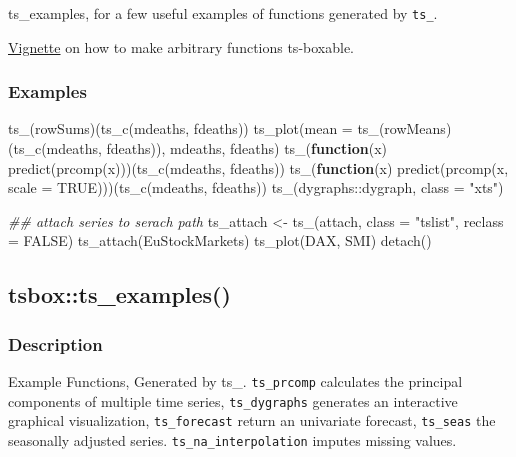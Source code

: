 \documentclass[
  letterpaper,
  DIV=11,
  numbers=noendperiod]{scrreport}
\newenvironment{Shaded}{\begin{snugshade}}{\end{snugshade}}
\newcommand{\AttributeTok}[1]{\textcolor[rgb]{0.40,0.45,0.13}{#1}}
\newcommand{\ConstantTok}[1]{\textcolor[rgb]{0.56,0.35,0.01}{#1}}
\newcommand{\ControlFlowTok}[1]{\textcolor[rgb]{0.00,0.23,0.31}{\textbf{#1}}}
\newcommand{\DocumentationTok}[1]{\textcolor[rgb]{0.37,0.37,0.37}{\textit{#1}}}
\newcommand{\FunctionTok}[1]{\textcolor[rgb]{0.28,0.35,0.67}{#1}}
\newcommand{\NormalTok}[1]{\textcolor[rgb]{0.00,0.23,0.31}{#1}}
\newcommand{\OtherTok}[1]{\textcolor[rgb]{0.00,0.23,0.31}{#1}}
\newcommand{\SpecialCharTok}[1]{\textcolor[rgb]{0.37,0.37,0.37}{#1}}
\newcommand{\StringTok}[1]{\textcolor[rgb]{0.13,0.47,0.30}{#1}}
\begin{document}
ts\_examples, for a few useful examples of functions generated by
\texttt{ts\_}.

\href{https://docs.ropensci.org/tsbox/articles/ts-functions.html}{Vignette}
on how to make arbitrary functions ts-boxable.

\subsubsection{Examples}\label{examples-81}

\begin{Shaded}
\begin{Highlighting}[]
\FunctionTok{ts\_}\NormalTok{(rowSums)(}\FunctionTok{ts\_c}\NormalTok{(mdeaths, fdeaths))}
\FunctionTok{ts\_plot}\NormalTok{(}\AttributeTok{mean =} \FunctionTok{ts\_}\NormalTok{(rowMeans)(}\FunctionTok{ts\_c}\NormalTok{(mdeaths, fdeaths)), mdeaths, fdeaths)}
\FunctionTok{ts\_}\NormalTok{(}\ControlFlowTok{function}\NormalTok{(x) }\FunctionTok{predict}\NormalTok{(}\FunctionTok{prcomp}\NormalTok{(x)))(}\FunctionTok{ts\_c}\NormalTok{(mdeaths, fdeaths))}
\FunctionTok{ts\_}\NormalTok{(}\ControlFlowTok{function}\NormalTok{(x) }\FunctionTok{predict}\NormalTok{(}\FunctionTok{prcomp}\NormalTok{(x, }\AttributeTok{scale =} \ConstantTok{TRUE}\NormalTok{)))(}\FunctionTok{ts\_c}\NormalTok{(mdeaths, fdeaths))}
\FunctionTok{ts\_}\NormalTok{(dygraphs}\SpecialCharTok{::}\NormalTok{dygraph, }\AttributeTok{class =} \StringTok{"xts"}\NormalTok{)}

\DocumentationTok{\#\# attach series to serach path}
\NormalTok{ts\_attach }\OtherTok{\textless{}{-}} \FunctionTok{ts\_}\NormalTok{(attach, }\AttributeTok{class =} \StringTok{"tslist"}\NormalTok{, }\AttributeTok{reclass =} \ConstantTok{FALSE}\NormalTok{)}
\FunctionTok{ts\_attach}\NormalTok{(EuStockMarkets)}
\FunctionTok{ts\_plot}\NormalTok{(DAX, SMI)}
\FunctionTok{detach}\NormalTok{()}
\end{Highlighting}
\end{Shaded}

\subsection{tsbox::ts\_examples()}\label{tsboxts_examples}

\subsubsection{Description}\label{description-83}

Example Functions, Generated by ts\_. \texttt{ts\_prcomp} calculates the
principal components of multiple time series, \texttt{ts\_dygraphs}
generates an interactive graphical visualization, \texttt{ts\_forecast}
return an univariate forecast, \texttt{ts\_seas} the seasonally adjusted
series. \texttt{ts\_na\_interpolation} imputes missing values.
\end{document}
